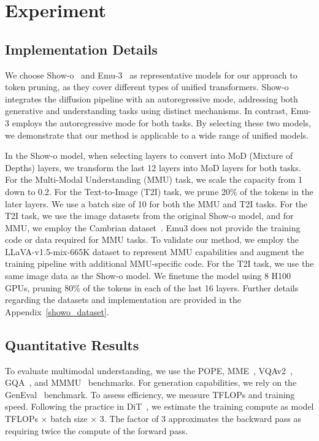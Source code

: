 

\section{Experiment}

\subsection{Implementation Details}

We choose Show-o~\cite{showo} and Emu-3~\cite{emu3} as representative models for our approach to token pruning, as they cover different types of unified transformers. Show-o integrates the diffusion pipeline with an autoregressive mode, addressing both generative and understanding tasks using distinct mechanisms. In contrast, Emu-3 employs the autoregressive mode for both tasks. By selecting these two models, we demonstrate that our method is applicable to a wide range of unified models.

In the Show-o model, when selecting layers to convert into MoD (Mixture of Depths) layers, we transform the last 12 layers into MoD layers for both tasks. For the Multi-Modal Understanding (MMU) task, we scale the capacity from 1 down to 0.2. For the Text-to-Image (T2I) task, we prune 20\% of the tokens in the later layers. We use a batch size of 10 for both the MMU and T2I tasks. For the T2I task, we use the image datasets from the original Show-o model, and for MMU, we employ the Cambrian dataset~\cite{cambrian}. Emu3 does not provide the training code or data required for MMU tasks. To validate our method, we employ the LLaVA-v1.5-mix-665K dataset to represent MMU capabilities and augment the training pipeline with additional MMU-specific code. For the T2I task, we use the same image data as the Show-o model. We finetune the model using 8 H100 GPUs, pruning 80\% of the tokens in each of the last 16 layers. Further details regarding the datasets and implementation are provided in the Appendix~\ref{showo_dataset}.




\subsection{Quantitative Results}

To evaluate multimodal understanding, we use the POPE\cite{pope}, MME~\cite{mme}, VQAv2~\cite{vqav2}, GQA~\cite{gqa}, and MMMU~\cite{mmmu} benchmarks. For generation capabilities, we rely on the GenEval~\cite{geneval} benchmark. To assess efficiency, we measure TFLOPs and training speed. Following the practice in DiT~\cite{dit}, we estimate the training compute as model TFLOPs × batch size × 3. The factor of 3 approximates the backward pass as requiring twice the compute of the forward pass. 


